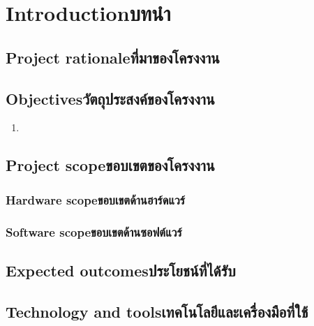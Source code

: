 \chapter{\ifenglish Introduction\else บทนำ\fi}

\section{\ifenglish Project rationale\else ที่มาของโครงงาน\fi}

\section{\ifenglish Objectives\else วัตถุประสงค์ของโครงงาน\fi}
\begin{enumerate}
    \item
\end{enumerate}

\section{\ifenglish Project scope\else ขอบเขตของโครงงาน\fi}

\subsection{\ifenglish Hardware scope\else ขอบเขตด้านฮาร์ดแวร์\fi}

\subsection{\ifenglish Software scope\else ขอบเขตด้านซอฟต์แวร์\fi}

\section{\ifenglish Expected outcomes\else ประโยชน์ที่ได้รับ\fi}

\section{\ifenglish Technology and tools\else เทคโนโลยีและเครื่องมือที่ใช้\fi}
